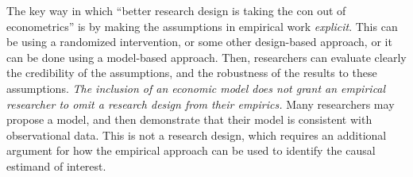 \documentclass{tufte-handout}
\theoremstyle{break}
\begin{document}
The key way in which ``better research design is taking the con out of econometrics'' is by making the assumptions in empirical work \emph{explicit}. This can be using a randomized intervention, or some other design-based approach, or it can be done using a model-based approach. Then, researchers can evaluate clearly the credibility of the assumptions, and the robustness of the results to these assumptions. \emph{The inclusion of an economic model does not grant an empirical researcher to omit a research design from their empirics.} Many researchers may propose a model, and then demonstrate that their model is consistent with observational data. This is not a research design, which requires an additional argument for how the empirical approach can be used to identify the causal estimand of interest.



\end{document}
